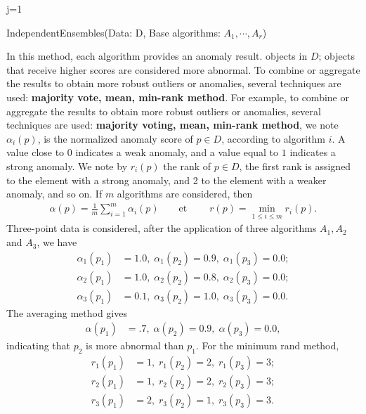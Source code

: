\begin{algorithm}
\SetAlgoLined
j=1\;
\caption{IndependentEnsembles(Data: D,
	Base algorithms: $A_1,\cdots,A_r$)}
\end{algorithm}
In this method, each algorithm provides an anomaly result.
objects in $D$; objects that receive higher scores are considered more abnormal. To combine or aggregate the results to obtain more robust outliers or anomalies, several techniques are used: \textbf{majority vote, mean, min-rank method}. For example, to combine or aggregate the results to obtain more robust outliers or anomalies, several techniques are used: \textbf{majority voting, mean, min-rank method}, 
we note $\alpha_i(p)$, is the normalized anomaly score of $p\in D$, according to algorithm $i$. A value close to $0$ indicates a weak anomaly, and a value equal to $1$ indicates a strong anomaly. We note by $r_i(p)$ the rank of $p\in D$, the first rank is assigned to the element with a strong anomaly, and 2 to the element with a weaker anomaly, and so on. If $m$ algorithms are considered, then
\begin{align}
\alpha(p)=\frac{1}{m}\sum_{i=1}^{m}\alpha_i(p) \qquad \text{et}\; \qquad r(p) =\min_{1\leq i \leq m} r_i(p).
\end{align}
 Three-point data is considered, after the application of three
algorithms $A_1, A_2$ and $A_3$, we have 
\begin{align*}
	\alpha_{1}\left(p_{1}\right)&=1.0,\; \alpha_{1}\left(p_{2}\right)=0.9,\; \alpha_{1}\left(p_{3}\right)=0.0; \\ 
\alpha_{2}\left(p_{1}\right)&=1.0,\; \alpha_{2}\left(p_{2}\right)=0.8,\; \alpha_{2}\left(p_{3}\right)=0.0;\\
\alpha_{3}\left(p_{1}\right)&=0.1,\;  \alpha_{3}\left(p_{2}\right)=1.0,\; \alpha_{3}\left(p_{3}\right)=0.0.
\end{align*}
The averaging method gives 
\begin{align*}
\alpha\left(p_{1}\right)&=.7,\; \alpha\left(p_{2}\right)=0.9,\; \alpha\left(p_{3}\right)=0.0,
\end{align*}
indicating that $p_2$ is more abnormal than $p_1$. For the minimum rand method,
\begin{align*}
r_{1}\left(p_{1}\right)&=1,\; r_{1}\left(p_{2}\right)=2,\; r_{1}\left(p_{3}\right)=3;\\ 
r_{2}\left(p_{1}\right)&=1,\; r_{2}\left(p_{2}\right)=2,\; r_{2}\left(p_{3}\right)=3;\\
r_{3}\left(p_{1}\right)&=2,\; r_{3}\left(p_{2}\right)=1,\; r_{3}\left(p_{3}\right)=3.
\end{align*}
